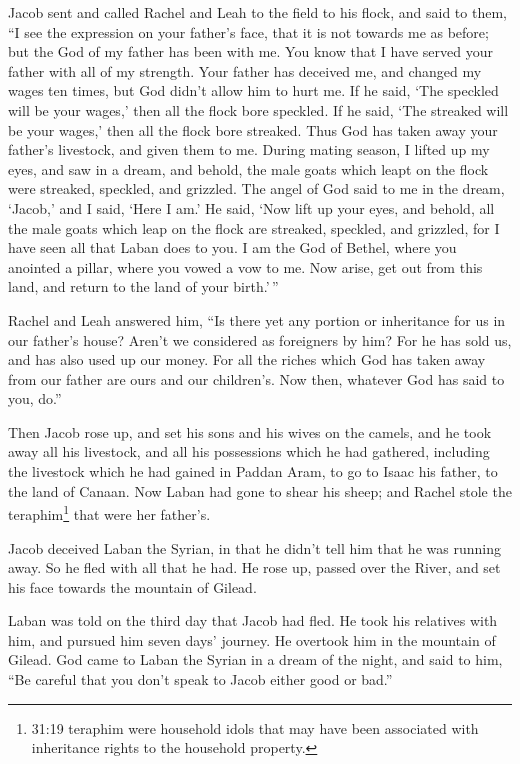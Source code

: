  Jacob sent and called Rachel and Leah to the field to his
flock,  and said to them, ``I see the expression on your
father's face, that it is not towards me as before; but the God of my
father has been with me.  You know that I have served your
father with all of my strength.  Your father has deceived
me, and changed my wages ten times, but God didn't allow him to hurt me.
 If he said, `The speckled will be your wages,' then all the
flock bore speckled. If he said, `The streaked will be your wages,' then
all the flock bore streaked.  Thus God has taken away your
father's livestock, and given them to me.  During mating
season, I lifted up my eyes, and saw in a dream, and behold, the male
goats which leapt on the flock were streaked, speckled, and grizzled.
 The angel of God said to me in the dream, `Jacob,' and I
said, `Here I am.'  He said, `Now lift up your eyes, and
behold, all the male goats which leap on the flock are streaked,
speckled, and grizzled, for I have seen all that Laban does to you.
 I am the God of Bethel, where you anointed a pillar, where
you vowed a vow to me. Now arise, get out from this land, and return to
the land of your birth.'\,''

 Rachel and Leah answered him, ``Is there yet any portion
or inheritance for us in our father's house?  Aren't we
considered as foreigners by him? For he has sold us, and has also used
up our money.  For all the riches which God has taken away
from our father are ours and our children's. Now then, whatever God has
said to you, do.''

 Then Jacob rose up, and set his sons and his wives on the
camels,  and he took away all his livestock, and all his
possessions which he had gathered, including the livestock which he had
gained in Paddan Aram, to go to Isaac his father, to the land of Canaan.
 Now Laban had gone to shear his sheep; and Rachel stole
the teraphim\footnote{31:19 teraphim were household idols that may have
  been associated with inheritance rights to the household property.}
that were her father's.

 Jacob deceived Laban the Syrian, in that he didn't tell
him that he was running away.  So he fled with all that he
had. He rose up, passed over the River, and set his face towards the
mountain of Gilead.

 Laban was told on the third day that Jacob had fled.
 He took his relatives with him, and pursued him seven
days' journey. He overtook him in the mountain of Gilead. 
God came to Laban the Syrian in a dream of the night, and said to him,
``Be careful that you don't speak to Jacob either good or bad.''


